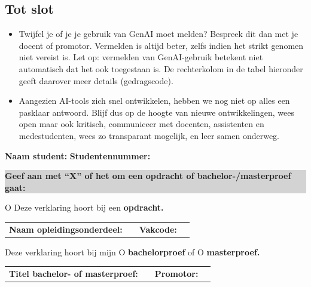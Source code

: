 \subsection*{Tot slot}
\begin{itemize}
    \item Twijfel je of je je gebruik van GenAI moet melden? Bespreek dit dan met je docent of promotor. Vermelden is altijd beter, zelfs indien het strikt genomen niet vereist is. Let op: vermelden van GenAI-gebruik betekent niet automatisch dat het ook toegestaan is. De rechterkolom in de tabel hieronder geeft daarover meer details (gedragscode). 
    \item Aangezien AI-tools zich snel ontwikkelen, hebben we nog niet op alles een pasklaar antwoord. Blijf dus op de hoogte van nieuwe ontwikkelingen, wees open maar ook kritisch, communiceer met docenten, assistenten en medestudenten, wees zo transparant mogelijk, en leer samen onderweg.
\end{itemize}
\newpage
\noindent
\textbf{Naam student:} \dotfill \hfill \textbf{Studentennummer:} \dotfill

\vspace{1em}

\noindent
\colorbox{lightgray}{\parbox{\dimexpr\linewidth-2\fboxsep\relax}{\textbf{Geef aan met “X” of het om een opdracht of bachelor-/masterproef gaat:}}}

\vspace{1em}

O Deze verklaring hoort bij een \textbf{opdracht.}

\begin{tabularx}{\linewidth}{@{}lXlX@{}}
\textbf{Naam opleidingsonderdeel:} & \dotfill & \textbf{Vakcode:} & \dotfill \\
\end{tabularx}

\vspace{1em}

Deze verklaring hoort bij mijn O \textbf{bachelorproef} of O \textbf{masterproef.}

\begin{tabularx}{\linewidth}{@{}lXlX@{}}
\textbf{Titel bachelor- of masterproef:} & \dotfill & \textbf{Promotor:} & \dotfill \\
\end{tabularx}

\vspace{1em}

